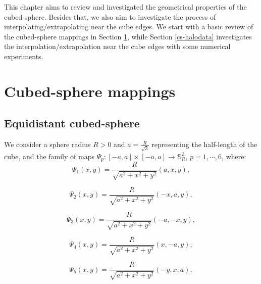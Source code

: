 This chapter aims to review and investigated the geometrical properties
of the cubed-sphere. Besides that, we also aim to investigate the process
of interpolating/extrapolating near the cube edges.
We start with a basic review of the cubed-sphere mappings in Section \ref{cs-mappings},
while Section \ref{cs-halodata} investigates the interpolation/extrapolation near the cube edges
with some numerical experiments.

\section{Cubed-sphere mappings}
\label{cs-mappings}

\subsection{Equidistant cubed-sphere}
\label{equidistant-cs}

We consider a sphere radius $R>0$ and
$a = \frac{R}{\sqrt{3}}$ representing the half-length of 
the cube, and the family of maps
$\Psi_{p}: [-a,a] \times [-a,a] \to \mathbb{S}^2_R$, $p=1, \cdots, 6$,
where:
\begin{equation}
	\label{chp3-eqdistant-psi1}
	\Psi_{1}(x,y) = \frac{R}{\sqrt{a^2 + x^2 + y^2}}(a, x, y), 
\end{equation}

\begin{equation}
	\label{chp3-eqdistant-psi2}
	\Psi_{2}(x,y) = \frac{R}{\sqrt{a^2 + x^2 + y^2}}(-x, a, y), 
\end{equation}

\begin{equation}
	\label{chp3-eqdistant-psi3}
	\Psi_{3}(x,y) = \frac{R}{\sqrt{a^2 + x^2 + y^2}}(-a, -x, y), 
\end{equation}

\begin{equation}
	\label{chp3-eqdistant-psi4}
	\Psi_{4}(x,y) = \frac{R}{\sqrt{a^2 + x^2 + y^2}}(x, -a, y), 
\end{equation}

\begin{equation}
	\label{chp3-eqdistant-psi5}
	\Psi_{5}(x,y) = \frac{R}{\sqrt{a^2 + x^2 + y^2}}(-y, x, a), 
\end{equation}

